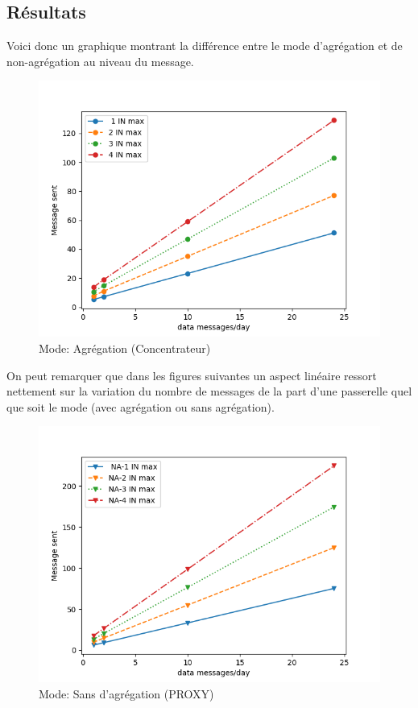 \subsection{Résultats}
Voici donc un graphique montrant la différence entre le mode d'agrégation et de non-agrégation au niveau du message.
\begin{figure}[htbp]
\centerline{\includegraphics[scale = 0.5]{graphics_resultats/A/A.png}}
\caption{Mode: Agrégation (Concentrateur)}
\label{A}
\end{figure}
On peut remarquer que dans les figures suivantes un aspect linéaire ressort nettement sur la variation du nombre de messages de la part d'une passerelle quel que soit le mode (avec agrégation ou sans agrégation).
\begin{figure}[htbp]
\centerline {\includegraphics[scale = 0.5]{graphics_resultats/A/NA.png}}
\caption{Mode: Sans d'agrégation (PROXY)}
\label{A}
\end{figure}
